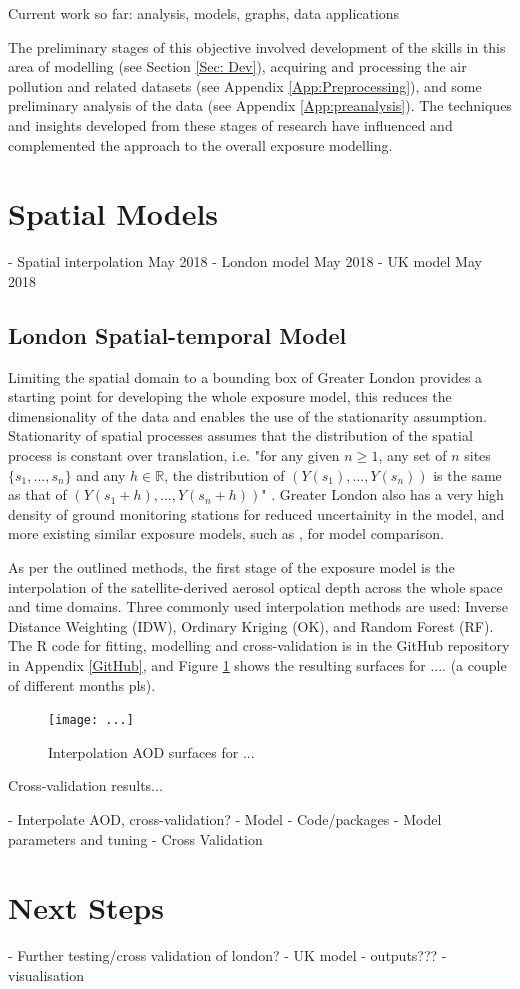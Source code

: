 Current work so far: analysis, models, graphs, data applications

The preliminary stages of this objective involved development of the skills in this area of modelling (see Section \ref{Sec: Dev}), acquiring and processing the air pollution and related datasets (see Appendix \ref{App:Preprocessing}), and some preliminary analysis of the data (see Appendix \ref{App:preanalysis}). The techniques and insights developed from these stages of research have influenced and complemented the approach to the overall exposure modelling.

\section{Spatial Models} \label{Spatial}
 - Spatial interpolation May 2018
 - London model May 2018
 - UK model May 2018
 
 
\subsection{London Spatial-temporal Model}
Limiting the spatial domain to a bounding box of Greater London provides a starting point for developing the whole exposure model, this reduces the dimensionality of the data and enables the use of the stationarity assumption. Stationarity of spatial processes assumes that the distribution of the spatial process is constant over translation, i.e. "for any given $n \geq 1$, any set of $n$ sites $\{s_1,...,s_n\}$ and any $h \in \mathbb{R}$, the distribution of $(Y(s_1),...,Y(s_n))$ is the same as that of $(Y(s_1+h),...,Y(s_n+h))$" \citep[p.23-24]{Banerjee2014}. Greater London also has a very high density of ground monitoring stations for reduced uncertainity in the model, and more existing similar exposure models, such as \cite{Forlani2020AR-INLA}, for model comparison.

As per the outlined methods, the first stage of the exposure model is the interpolation of the satellite-derived aerosol optical depth across the whole space and time domains. Three commonly used interpolation methods are used: Inverse Distance Weighting (IDW), Ordinary Kriging (OK), and Random Forest (RF). The R code for fitting, modelling and cross-validation is in the GitHub repository in Appendix \ref{GitHub}, and Figure \ref{fig:AODinter} shows the resulting surfaces for .... (a couple of different months pls).

\begin{figure}[h]
    \centering
    \texttt{[image: ...]}
    \caption{Interpolation AOD surfaces for ...}
    \label{fig:AODinter}
\end{figure}

Cross-validation results...

 - Interpolate AOD, cross-validation?
 - Model
 - Code/packages
 - Model parameters and tuning
 - Cross Validation

\section{Next Steps}
- Further testing/cross validation of london?
- UK model
- outputs???
- visualisation
